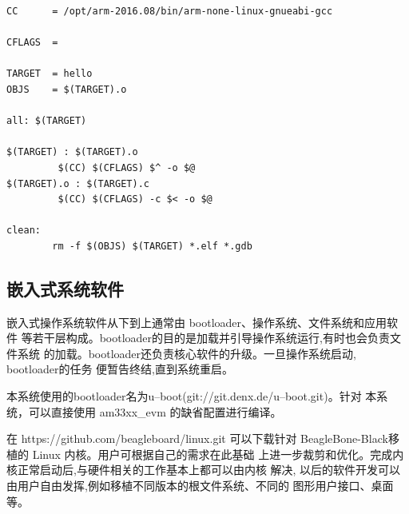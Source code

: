 \begin{boxedminipage}{.9\textwidth}
\lstset{language=make}
\begin{lstlisting}
CC      = /opt/arm-2016.08/bin/arm-none-linux-gnueabi-gcc

CFLAGS  =

TARGET  = hello
OBJS    = $(TARGET).o

all: $(TARGET)

$(TARGET) : $(TARGET).o
         $(CC) $(CFLAGS) $^ -o $@
$(TARGET).o : $(TARGET).c
         $(CC) $(CFLAGS) -c $< -o $@

clean:
        rm -f $(OBJS) $(TARGET) *.elf *.gdb
\end{lstlisting}
\end{boxedminipage}


\subsection{嵌入式系统软件}
	嵌入式操作系统软件从下到上通常由 bootloader、操作系统、文件系统和应用软件
等若干层构成。bootloader的目的是加载并引导操作系统运行,有时也会负责文件系统
的加载。bootloader还负责核心软件的升级。一旦操作系统启动, bootloader的任务
便暂告终结,直到系统重启。

	本系统使用的bootloader名为u--boot(git://git.denx.de/u--boot.git)。针对
本系统，可以直接使用 am33xx\_evm 的缺省配置进行编译。

	在 https://github.com/beagleboard/linux.git 可以下载针对
	BeagleBone-Black移植的 Linux 内核。用户可根据自己的需求在此基础
上进一步裁剪和优化。完成内核正常启动后,与硬件相关的工作基本上都可以由内核
解决, 以后的软件开发可以由用户自由发挥,例如移植不同版本的根文件系统、不同的
图形用户接口、桌面等。
